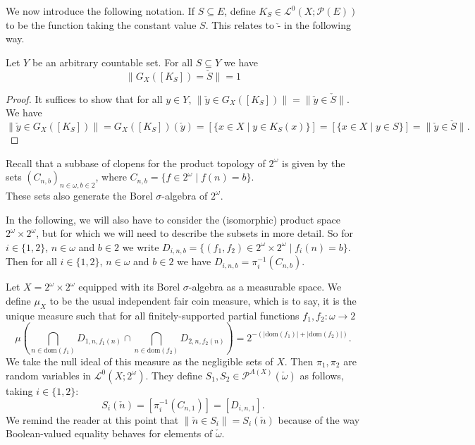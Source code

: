 \documentclass{lmcs}
\newcommand{\blank}{\ensuremath{{\mbox{-}}}}
\newcommand{\dom}{\ensuremath{\mathrm{dom}}}
\newcommand{\Ell}{\mathcal{L}}
\newcommand{\powerset}{\ensuremath{\mathcal{P}}}
\newcommand{\axpowerset}{\powerset^{A(X)}}
\begin{document}
We now introduce the following notation. If $S \subseteq E$, define $K_S \in \Ell^0(X;\powerset(E))$ to be the function taking the constant value $S$. This relates to $\check{\blank}$ in the following way. 
\begin{lem}
\label{ConstantClassicalLemma}
Let $Y$ be an arbitrary countable set. For all $S \subseteq Y$ we have
\[
\| G_X([K_S]) = \check{S} \| = 1
\]
\end{lem}
\begin{proof}
It suffices to show that for all $y \in Y$, $\| \check{y} \in G_X([K_S]) \| = \| \check{y} \in \check{S} \|$. We have
\[
\| \check{y} \in G_X([K_S]) \| = G_X([K_S])(\check{y}) = [\{ x \in X \mid y \in K_S(x)\}] = [\{ x \in X \mid y \in S\}] = \| \check{y} \in \check{S} \|.
\]
\end{proof}

Recall that a subbase of clopens for the product topology of $2^\omega$ is given by the sets $(C_{n,b})_{n \in \omega, b \in 2}$, where
$
C_{n,b} = \{ f \in 2^\omega \mid f(n) = b \}.
$
\\These sets also generate the Borel $\sigma$-algebra of $2^\omega$. 

In the following, we will also have to consider the (isomorphic) product space $2^\omega \times 2^\omega$, but for which we will need to describe the subsets in more detail. So for $i \in \{1,2\}$, $n \in \omega$ and $b \in 2$ we write
$
D_{i,n,b} = \{ (f_1,f_2) \in 2^\omega \times 2^\omega \mid f_i(n) = b \}.
$
\\Then for all $i \in \{ 1, 2 \}$, $n \in \omega$ and $b \in 2$ we have $D_{i,n,b} = \pi_i^{-1}(C_{n,b})$. 

Let $X = 2^\omega \times 2^\omega$ equipped with its Borel $\sigma$-algebra as a measurable space. We define $\mu_X$ to be the usual independent fair coin measure, which is to say, it is the unique measure such that for all finitely-supported partial functions $f_1,f_2 : \omega \rightarrow 2$
\[
\mu\left(\bigcap_{n \in \dom(f_1)} D_{1,n,f_1(n)} \cap \bigcap_{n \in \dom(f_2)} D_{2,n,f_2(n)}\right) = 2^{-(|\dom(f_1)| + |\dom(f_2)|)}. 
\]
We take the null ideal of this measure as the negligible sets of $X$. Then $\pi_1,\pi_2$ are random variables in $\Ell^0(X;2^\omega)$. They define $S_1,S_2 \in \axpowerset(\check{\omega})$ as follows, taking $i \in \{1,2\}$:
\begin{equation}
	\label{SiDefEqn}
	S_i(\check{n}) = [\pi_i^{-1}(C_{n,1})] = [D_{i,n,1}].
\end{equation}
We remind the reader at this point that $\| \check{n} \in S_i \| = S_i(\check{n})$ because of the way Boolean-valued equality behaves for elements of $\check{\omega}$. 
\end{document}
